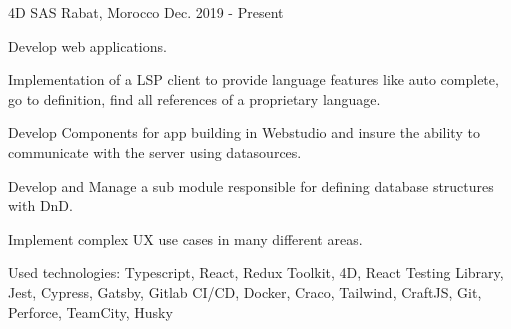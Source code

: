 \begin{cventries}
    {4D SAS} %
    {Rabat, Morocco} %
    {Dec. 2019 - Present} %
    {
      \begin{cvitems} %
        \item {Develop web applications.}
        \item {Implementation of a LSP client to provide language features like auto complete, go to definition, find all references of a proprietary language.}
        \item {Develop Components for app building in Webstudio and insure the ability to communicate with the server using datasources.}
        \item {Develop and Manage a sub module responsible for defining database structures with DnD.}
        \item {Implement complex UX use cases in many different areas.}
        \item {Used technologies: Typescript, React, Redux Toolkit, 4D, React Testing Library, Jest, Cypress, Gatsby, Gitlab CI/CD, Docker, Craco, Tailwind, CraftJS, Git, Perforce, TeamCity, Husky}
      \end{cvitems}
    }


\end{cventries}
